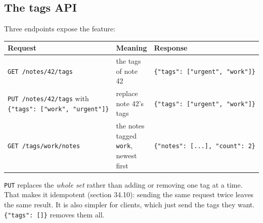 \subsection*{The tags API}\label{33-logic-execution:the-tags-api}

Three endpoints expose the feature:


{\def\LTcaptype{none} %
\begin{longtable}[]{@{}
  >{\raggedright\arraybackslash}p{}
  >{\raggedright\arraybackslash}p{}
  >{\raggedright\arraybackslash}p{}@{}}
\toprule\noalign{}
\begin{minipage}[b]{\linewidth}\raggedright
Request
\end{minipage} & \begin{minipage}[b]{\linewidth}\raggedright
Meaning
\end{minipage} & \begin{minipage}[b]{\linewidth}\raggedright
Response
\end{minipage} \\
\midrule\noalign{}
\endhead
\bottomrule\noalign{}
\endlastfoot
\texttt{GET\ /}\allowbreak{}\texttt{notes/}\allowbreak{}\texttt{42/}\allowbreak{}\texttt{tags} & the tags of note 42 & \texttt{\{"tags":}\allowbreak{}\texttt{\ {[}"urgent",}\allowbreak{}\texttt{\ "work"{]}\}} \\
\texttt{PUT\ /}\allowbreak{}\texttt{notes/}\allowbreak{}\texttt{42/}\allowbreak{}\texttt{tags} with \texttt{\{"tags":}\allowbreak{}\texttt{\ {[}"work",}\allowbreak{}\texttt{\ "urgent"{]}\}} & replace note 42's tags & \texttt{\{"tags":}\allowbreak{}\texttt{\ {[}"urgent",}\allowbreak{}\texttt{\ "work"{]}\}} \\
\texttt{GET\ /}\allowbreak{}\texttt{tags/}\allowbreak{}\texttt{work/}\allowbreak{}\texttt{notes} & the notes tagged \texttt{work}, newest first & \texttt{\{"notes":}\allowbreak{}\texttt{\ {[}.}\allowbreak{}\texttt{.}\allowbreak{}\texttt{.}\allowbreak{}\texttt{{]},}\allowbreak{}\texttt{\ "count":}\allowbreak{}\texttt{\ 2\}} \\
\end{longtable}
}

\texttt{PUT} replaces the \emph{whole set} rather than adding or removing one tag at a time. That makes it idempotent (section 34.10): sending the same request twice leaves the same result. It is also simpler for clients, which just send the tags they want. \texttt{\{"tags":\ {[}{]}\}} removes them all.


